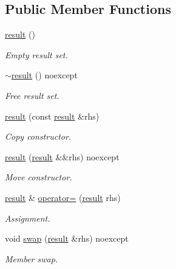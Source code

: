 \subsection*{Public Member Functions}
\begin{DoxyCompactItemize}
\item 
\mbox{\hyperlink{classnanodbc_1_1result_ad4d59619a46d67bbc171d0d5c9e84705}{result}} ()
\begin{DoxyCompactList}\small\item\em Empty result set. \end{DoxyCompactList}\item 
\mbox{\hyperlink{classnanodbc_1_1result_a19f6d7665824d9b06d7c2db22b34b4f3}{$\sim$result}} () noexcept
\begin{DoxyCompactList}\small\item\em Free result set. \end{DoxyCompactList}\item 
\mbox{\hyperlink{classnanodbc_1_1result_a47f04c9526ecd6a1abf503ac534edc23}{result}} (const \mbox{\hyperlink{classnanodbc_1_1result}{result}} \&rhs)
\begin{DoxyCompactList}\small\item\em Copy constructor. \end{DoxyCompactList}\item 
\mbox{\hyperlink{classnanodbc_1_1result_af616d94ee18fa55cfd60687b98ff9ebd}{result}} (\mbox{\hyperlink{classnanodbc_1_1result}{result}} \&\&rhs) noexcept
\begin{DoxyCompactList}\small\item\em Move constructor. \end{DoxyCompactList}\item 
\mbox{\hyperlink{classnanodbc_1_1result}{result}} \& \mbox{\hyperlink{classnanodbc_1_1result_a231eaf6046c90656ab52337e1549d572}{operator=}} (\mbox{\hyperlink{classnanodbc_1_1result}{result}} rhs)
\begin{DoxyCompactList}\small\item\em Assignment. \end{DoxyCompactList}\item 
void \mbox{\hyperlink{classnanodbc_1_1result_a8cfba4b26f5dbddc955494484bc41a0d}{swap}} (\mbox{\hyperlink{classnanodbc_1_1result}{result}} \&rhs) noexcept
\begin{DoxyCompactList}\small\item\em Member swap. \end{DoxyCompactList}\item 

\end{DoxyCompactItemize}
